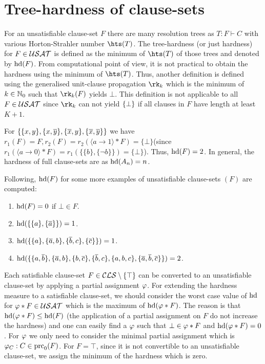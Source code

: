 \documentclass[]{book}
\begin{document}
\section{Tree-hardness of clause-sets}
\label{sec:Hardnessunsat}

For an unsatisfiable clause-set $F$ there are many resolution trees as $T : F \vdash C$ with various Horton-Strahler number $\hts(T)$. The tree-hardness (or just hardness) for $F \in \mathcal{USAT}$ is defined as the minimum of $\hts(T)$ of those trees and denoted by $\operatorname{hd}(F)$.
From computational point of view, it is not practical to obtain the hardness using the minimum of $\hts(T)$. Thus, another definition is defined using the generalised unit-clause propagation $\rk_k$ which is the minimum of $k \in \mathbb{N}_0$ such that $\rk_k(F)$ yields $\bot$. This definition is not applicable to all $F \in \mathcal{USAT}$ since $\rk_k$ can not yield $\{ \bot \}$ if all clauses in $F$ have length at least $K+1$.

\begin{examp}\label{exp:harducls}
For $\{ \{ x,y \},\{ x,\overline{y} \},\{ \overline{x},y \},\{ \overline{x},\overline{y} \} \}$ we have $r_1(F)=F, r_2(F)=r_2( \langle a \rightarrow 1 \rangle * F) = \{ \bot \}$(since $r_1( \langle a \rightarrow 0 \rangle * F)=r_1 (\{\{ b \}, \{ \neg b \}\}) = \{ \bot \}$). Thus, $\operatorname{hd}(F) = 2$. In general, the hardness of full clause-sets are as $\operatorname{hd}(A_n)=n$.
  
Following, $\operatorname{hd}(F)$ for some more examples of unsatisfiable clause-sets $(F)$ are computed:
  \begin{enumerate}
  \item $\operatorname{hd}(F) = 0$ if $\bot \in F$.
  \item $\operatorname{hd}(\{ \{ a \},\{ \overline{a} \} \}) = 1$.
  \item $\operatorname{hd}(\{ \{ a \},\{ \overline{a},b \}, \{ \overline{b},c \}, \{ \overline{c} \} \}) = 1$.
  \item $\operatorname{hd}(\{ \{ a,\overline{b} \},\{ \overline{a},b \},\{ b,\overline{c} \},\{ \overline{b},c \},\{ a,b,c \},\{ \overline{a},\overline{b},\overline{c} \} \}) = 2$.
  \end{enumerate}
\end{examp}

Each satisfiable clause-set $F \in \mathcal{CLS} \setminus \{ \top \}$ can be converted to an unsatisfiable clause-set by applying a partial assignment $\varphi$. For extending the hardness measure to a satisfiable clause-set, we should consider the worst case value of $\operatorname{hd}$ for $\varphi * F \in \mathcal{USAT}$ which is the maximum of $\operatorname{hd}(\varphi * F)$. The reason is that $\operatorname{hd}(\varphi * F) \leq \operatorname{hd}(F)$ (the application of a partial assignment on $F$ do not increase the hardness) and one can easily find a $\varphi$ such that $\bot \in \varphi * F$ and $\operatorname{hd}(\varphi * F)=0$. For $\varphi$ we only need to consider the minimal partial assignment which is $\varphi_C : C \in \operatorname{prc}_0(F)$. For $F = \top$, since it is not convertible to an unsatisfiable clause-set, we assign the minimum of the hardness which is zero.
\end{document}
